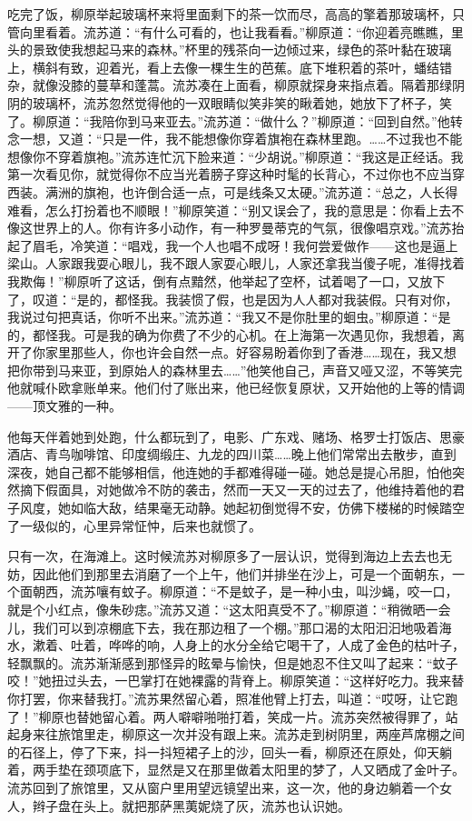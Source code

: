 \par 吃完了饭，柳原举起玻璃杯来将里面剩下的茶一饮而尽，高高的擎着那玻璃杯，只管向里看着。流苏道：“有什么可看的，也让我看看。”柳原道：“你迎着亮瞧瞧，里头的景致使我想起马来的森林。”杯里的残茶向一边倾过来，绿色的茶叶黏在玻璃上，横斜有致，迎着光，看上去像一棵生生的芭蕉。底下堆积着的茶叶，蟠结错杂，就像没膝的蔓草和蓬蒿。流苏凑在上面看，柳原就探身来指点着。隔着那绿阴阴的玻璃杯，流苏忽然觉得他的一双眼睛似笑非笑的瞅着她，她放下了杯子，笑了。柳原道：“我陪你到马来亚去。”流苏道：“做什么？”柳原道：“回到自然。”他转念一想，又道：“只是一件，我不能想像你穿着旗袍在森林里跑。……不过我也不能想像你不穿着旗袍。”流苏连忙沉下脸来道：“少胡说。”柳原道：“我这是正经话。我第一次看见你，就觉得你不应当光着膀子穿这种时髦的长背心，不过你也不应当穿西装。满洲的旗袍，也许倒合适一点，可是线条又太硬。”流苏道：“总之，人长得难看，怎么打扮着也不顺眼！”柳原笑道：“别又误会了，我的意思是：你看上去不像这世界上的人。你有许多小动作，有一种罗曼蒂克的气氛，很像唱京戏。”流苏抬起了眉毛，冷笑道：“唱戏，我一个人也唱不成呀！我何尝爱做作——这也是逼上梁山。人家跟我耍心眼儿，我不跟人家耍心眼儿，人家还拿我当傻子呢，准得找着我欺侮！”柳原听了这话，倒有点黯然，他举起了空杯，试着喝了一口，又放下了，叹道：“是的，都怪我。我装惯了假，也是因为人人都对我装假。只有对你，我说过句把真话，你听不出来。”流苏道：“我又不是你肚里的蛔虫。”柳原道：“是的，都怪我。可是我的确为你费了不少的心机。在上海第一次遇见你，我想着，离开了你家里那些人，你也许会自然一点。好容易盼着你到了香港……现在，我又想把你带到马来亚，到原始人的森林里去……”他笑他自己，声音又哑又涩，不等笑完他就喊仆欧拿账单来。他们付了账出来，他已经恢复原状，又开始他的上等的情调——顶文雅的一种。
\par 他每天伴着她到处跑，什么都玩到了，电影、广东戏、赌场、格罗士打饭店、思豪酒店、青鸟咖啡馆、印度绸缎庄、九龙的四川菜……晚上他们常常出去散步，直到深夜，她自己都不能够相信，他连她的手都难得碰一碰。她总是提心吊胆，怕他突然摘下假面具，对她做冷不防的袭击，然而一天又一天的过去了，他维持着他的君子风度，她如临大敌，结果毫无动静。她起初倒觉得不安，仿佛下楼梯的时候踏空了一级似的，心里异常怔忡，后来也就惯了。
\par 只有一次，在海滩上。这时候流苏对柳原多了一层认识，觉得到海边上去去也无妨，因此他们到那里去消磨了一个上午，他们并排坐在沙上，可是一个面朝东，一个面朝西，流苏嚷有蚊子。柳原道：“不是蚊子，是一种小虫，叫沙蝇，咬一口，就是个小红点，像朱砂痣。”流苏又道：“这太阳真受不了。”柳原道：“稍微晒一会儿，我们可以到凉棚底下去，我在那边租了一个棚。”那口渴的太阳汩汩地吸着海水，漱着、吐着，哗哗的响，人身上的水分全给它喝干了，人成了金色的枯叶子，轻飘飘的。流苏渐渐感到那怪异的眩晕与愉快，但是她忍不住又叫了起来：“蚊子咬！”她扭过头去，一巴掌打在她裸露的背脊上。柳原笑道：“这样好吃力。我来替你打罢，你来替我打。”流苏果然留心着，照准他臂上打去，叫道：“哎呀，让它跑了！”柳原也替她留心着。两人噼噼啪啪打着，笑成一片。流苏突然被得罪了，站起身来往旅馆里走，柳原这一次并没有跟上来。流苏走到树阴里，两座芦席棚之间的石径上，停了下来，抖一抖短裙子上的沙，回头一看，柳原还在原处，仰天躺着，两手垫在颈项底下，显然是又在那里做着太阳里的梦了，人又晒成了金叶子。流苏回到了旅馆里，又从窗户里用望远镜望出来，这一次，他的身边躺着一个女人，辫子盘在头上。就把那萨黑荑妮烧了灰，流苏也认识她。
